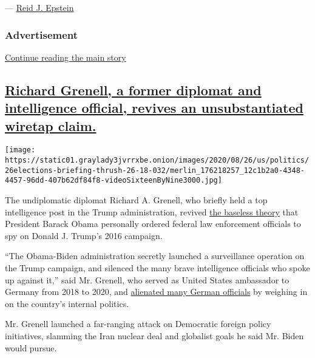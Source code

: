 --- \href{https://www.nytimes3xbfgragh.onion/by/reid-j-epstein}{Reid J.
Epstein}

\hypertarget{advertisement}{%
\subsubsection{Advertisement}\label{advertisement}}

\protect\hyperlink{after-dfp-ad-mid1}{Continue reading the main story}

\hypertarget{richard-grenell-a-former-diplomat-and-intelligence-official-revives-an-unsubstantiated-wiretap-claim}{%
\subsection{\texorpdfstring{\protect\hyperlink{richard-grenell-a-former-diplomat-and-intelligence-official-revives-an-unsubstantiated-wiretap-claim}{Richard
Grenell, a former diplomat and intelligence official, revives an
unsubstantiated wiretap
claim.}}{Richard Grenell, a former diplomat and intelligence official, revives an unsubstantiated wiretap claim.}}\label{richard-grenell-a-former-diplomat-and-intelligence-official-revives-an-unsubstantiated-wiretap-claim}}

\texttt{[image: https://static01.graylady3jvrrxbe.onion/images/2020/08/26/us/politics/26elections-briefing-thrush-26-18-032/merlin\_176218257\_12c1b2a0-4348-4457-96dd-407b62df84f8-videoSixteenByNine3000.jpg]}

The undiplomatic diplomat Richard A. Grenell, who briefly held a top
intelligence post in the Trump administration, revived
\href{https://www.nytimes3xbfgragh.onion/2017/03/06/us/politics/fact-checking-trumps-defenses-of-his-wiretapping-claim.html}{the
baseless theory} that President Barack Obama personally ordered federal
law enforcement officials to spy on Donald J. Trump's 2016 campaign.

``The Obama-Biden administration secretly launched a surveillance
operation on the Trump campaign, and silenced the many brave
intelligence officials who spoke up against it,'' said Mr. Grenell, who
served as United States ambassador to Germany from 2018 to 2020, and
\href{https://www.wsj.com/articles/trumps-favorite-ambassador-makes-a-very-trumpian-splash-in-berlin-11563029427}{alienated
many German officials} by weighing in on the country's internal
politics.

Mr. Grenell launched a far-ranging attack on Democratic foreign policy
initiatives, slamming the Iran nuclear deal and globalist goals he said
Mr. Biden would pursue.

